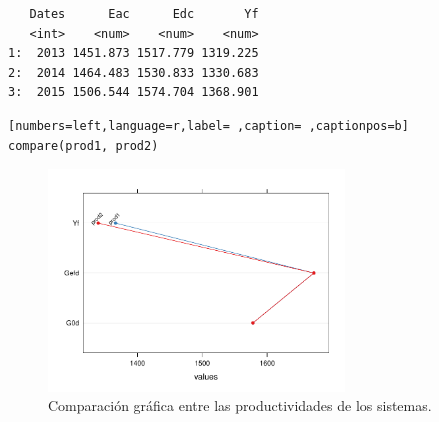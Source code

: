 \begin{verbatim}
   Dates      Eac      Edc       Yf
   <int>    <num>    <num>    <num>
1:  2013 1451.873 1517.779 1319.225
2:  2014 1464.483 1530.833 1330.683
3:  2015 1506.544 1574.704 1368.901
\end{verbatim}


\begin{lstlisting}[numbers=left,language=r,label= ,caption= ,captionpos=b]
compare(prod1, prod2)
\end{lstlisting}

\begin{figure}[htbp]
\centering
\includegraphics[width=0.7\textwidth]{figuras/ejemplos4.pdf}
\caption{Comparación gráfica entre las productividades de los sistemas.}
\end{figure}


